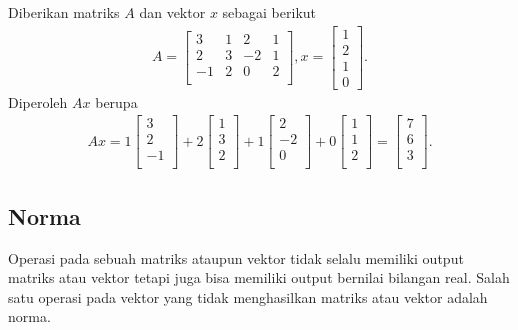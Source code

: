 \begin{contoh}
Diberikan matriks $A$ dan vektor $x$ sebagai berikut
\begin{gather*}
     A=
    \begin{bmatrix}
    3 & 1 & 2 & 1\\
    2 & 3 & -2 & 1\\
    -1 & 2 & 0 & 2\\
    \end{bmatrix},
    x=
    \begin{bmatrix}
    1 \\
    2 \\
    1 \\
    0
    \end{bmatrix}.
\end{gather*}
Diperoleh $Ax$ berupa
\begin{gather*}
    Ax = 
    1\begin{bmatrix}
    3 \\
    2 \\
    -1\\
    \end{bmatrix}+
    2\begin{bmatrix}
    1 \\
    3 \\
    2 \\
    \end{bmatrix}+
    1\begin{bmatrix}
    2 \\
    -2 \\
    0 \\
    \end{bmatrix}+
    0\begin{bmatrix}
    1\\
    1\\
    2\\
    \end{bmatrix} =
    \begin{bmatrix}
    7\\
    6\\
    3\\
    \end{bmatrix}.
\end{gather*}
\end{contoh}

\subsection{Norma}
Operasi pada sebuah matriks ataupun vektor tidak selalu memiliki output matriks atau vektor tetapi juga bisa memiliki output bernilai bilangan real. Salah satu operasi pada vektor yang tidak menghasilkan matriks atau vektor adalah norma.

